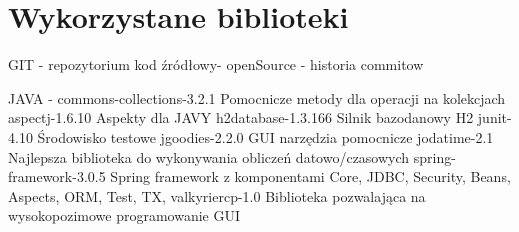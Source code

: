 
\section{Wykorzystane biblioteki}
\label{sec:wykorzystaneBiblioteki}
GIT - repozytorium kod źródłowy- openSource - historia commitow

JAVA -
commons-collections-3.2.1	Pomocnicze metody dla operacji na kolekcjach
aspectj-1.6.10			Aspekty dla JAVY
h2database-1.3.166		Silnik bazodanowy H2
junit-4.10			Środowisko testowe
jgoodies-2.2.0 			GUI narzędzia pomocnicze
jodatime-2.1			Najlepsza biblioteka do wykonywania obliczeń datowo/czasowych 
spring-framework-3.0.5		Spring framework z komponentami Core, JDBC, Security, Beans, Aspects, ORM, Test, TX, 
valkyriercp-1.0			Biblioteka pozwalająca na wysokopozimowe programowanie GUI

